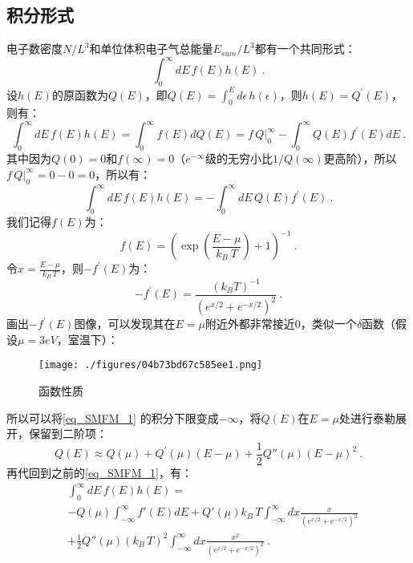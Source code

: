 \subsection{积分形式}
电子数密度$N/L^3$和单位体积电子气总能量$E_{sum}/L^3$都有一个共同形式：
\begin{equation}
\int_0^{\infty} dE\,f(E)h(E)~.
\end{equation}
设$h(E)$的原函数为$Q(E)$，即$Q(E)=\int_0^E d\epsilon\,h(\epsilon)$，则$h(E)=Q^\prime(E)$，则有：
\begin{equation}
\int_0^{\infty} dE\,f(E)h(E)=\int_0^{\infty} f(E)dQ(E)= f\,Q\bigg|_0^\infty-\int_0^{\infty} Q(E)f^\prime (E)dE~.
\end{equation}
其中因为$Q(0)=0$和$f(\infty)=0$（$e^{-\infty}$级的无穷小比$1/Q(\infty)$更高阶），所以$f\,Q\bigg|_0^\infty=0-0=0$，所以有：
\begin{equation}\label{eq_SMFM_1}
\int_0^{\infty} dE\,f(E)h(E)=-\int_0^{\infty} dE\,Q(E)f^\prime (E)~.
\end{equation}
我们记得$f(E)$为：
\begin{equation}
f(E)=\left (\exp(\frac{E-\mu}{k_B\ T})+1\right )^{-1}~.
\end{equation}
令$x=\frac{E-\mu}{k_B\,T}$，则$-f^\prime(E)$为：
\begin{equation}
-f^\prime(E)=\frac{(k_BT)^{-1}}{(e^{x/2}+e^{-x/2})^2}~.
\end{equation}
画出$-f^\prime(E)$图像，可以发现其在$E=\mu$附近外都非常接近0，类似一个$\delta$函数（假设$\mu=3eV$，室温下）：
\begin{figure}[ht]
\centering
\texttt{[image: ./figures/04b73bd67c585ee1.png]}
\caption{函数性质} \label{fig_SMFM_4}
\end{figure}
所以可以将\autoref{eq_SMFM_1} 的积分下限变成$-\infty$，将$Q(E)$在$E=\mu$处进行泰勒展开，保留到二阶项：
\begin{equation}
Q(E)\approx Q(\mu)+Q^\prime (\mu)(E-\mu)+\frac{1}{2}Q''(\mu)(E-\mu)^2~.
\end{equation}
再代回到之前的\autoref{eq_SMFM_1}，有：
\begin{equation}
\begin{aligned}
&\int_0^{\infty} dE\,f(E)h(E)=\\
&-Q(\mu)\int_{-\infty}^{\infty}f'(E)dE+Q'(\mu)k_B\,T\int_{-\infty}^{\infty}dx\frac{x}{(e^{x/2}+e^{-x/2})^2}\\
&+\frac{1}{2}Q''(\mu)(k_B\,T)^2\int_{-\infty}^{\infty}dx\frac{x^2}{(e^{x/2}+e^{-x/2})^2}~.
\end{aligned}
\end{equation}



